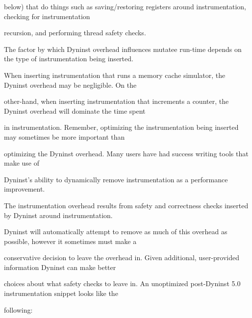 {{{below) that do things such as saving/restoring registers around instrumentation, checking for instrumentation

recursion, and performing thread safety checks.





\bigskip



{

The factor by which Dyninst overhead influences mutatee run-time depends on the type of instrumentation being inserted.

When inserting instrumentation that runs a memory cache simulator, the Dyninst overhead may be negligible. On the

other-hand, when inserting instrumentation that increments a counter, the Dyninst overhead will dominate the time spent

in instrumentation. Remember, optimizing the instrumentation being inserted may sometimes be more important than

optimizing the Dyninst overhead. Many users have had success writing tools that make use of

Dyninst's ability to dynamically remove instrumentation as a performance improvement.}





\bigskip



{

The instrumentation overhead results from safety and correctness checks inserted by Dyninst around instrumentation.

Dyninst will automatically attempt to remove as much of this overhead as possible, however it sometimes must make a

conservative decision to leave the overhead in. Given additional, user-provided information Dyninst can make better

choices about what safety checks to leave in. An unoptimized post-Dyninst 5.0 instrumentation snippet looks like the

following:}





\bigskip



\begin{flushleft}

\tablefirsthead{}

\tablehead{}


\end{flushleft}}}}

